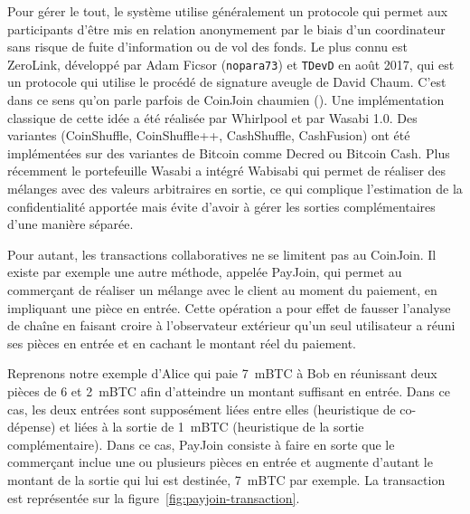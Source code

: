 Pour gérer le tout, le système utilise généralement un protocole qui permet aux participants d'être mis en relation anonymement par le biais d'un coordinateur sans risque de fuite d'information ou de vol des fonds. Le plus connu est ZeroLink, développé par Adam Ficsor (\texttt{nopara73}) et \texttt{TDevD} en août 2017, qui est un protocole qui utilise le procédé de signature aveugle de David Chaum. C'est dans ce sens qu'on parle parfois de CoinJoin chaumien (). Une implémentation classique de cette idée a été réalisée par Whirlpool et par Wasabi 1.0. Des variantes (CoinShuffle, CoinShuffle++, CashShuffle, CashFusion) ont été implémentées sur des variantes de Bitcoin comme Decred ou Bitcoin Cash. Plus récemment le portefeuille Wasabi a intégré Wabisabi qui permet de réaliser des mélanges avec des valeurs arbitraires en sortie, ce qui complique l'estimation de la confidentialité apportée mais évite d'avoir à gérer les sorties complémentaires d'une manière séparée.

Pour autant, les transactions collaboratives ne se limitent pas au CoinJoin. Il existe par exemple une autre méthode, appelée PayJoin, qui permet au commerçant de réaliser un mélange avec le client au moment du paiement, en impliquant une pièce en entrée. Cette opération a pour effet de fausser l'analyse de chaîne en faisant croire à l'observateur extérieur qu'un seul utilisateur a réuni ses pièces en entrée et en cachant le montant réel du paiement.

Reprenons notre exemple d'Alice qui paie 7~mBTC à Bob en réunissant deux pièces de 6 et 2~mBTC afin d'atteindre un montant suffisant en entrée. Dans ce cas, les deux entrées sont supposément liées entre elles (heuristique de co-dépense) et liées à la sortie de 1~mBTC (heuristique de la sortie complémentaire). Dans ce cas, PayJoin consiste à faire en sorte que le commerçant inclue une ou plusieurs pièces en entrée et augmente d'autant le montant de la sortie qui lui est destinée, 7~mBTC par exemple. La transaction est représentée sur la figure~\ref{fig:payjoin-transaction}.

